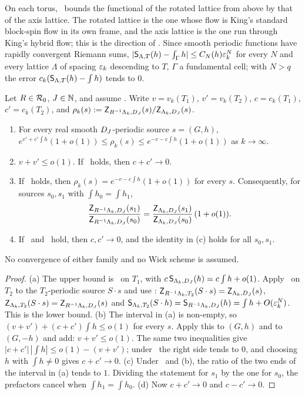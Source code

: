 On each torus, \hypF\ bounds the functional of the rotated lattice from above by that of the axis lattice. The rotated lattice is the one whose flow is King's standard block-spin flow in its own frame, and the axis lattice is the one run through King's hybrid flow; this is the direction of \cite[(4.7)--(4.9)]{K2}. Since smooth periodic functions have rapidly convergent Riemann sums, $|\mathsf S_{\Lambda,T}(h)-\int_\Gamma h|\le C_N(h)\varepsilon_k^N$ for every $N$ and every lattice $\Lambda$ of spacing $\varepsilon_k$ descending to $T$, $\Gamma$ a fundamental cell; with $N>q$ the error $c_k(\mathsf S_{\Lambda,T}(h)-\int h)$ tends to $0$.

\begin{theorem}\label{rot:thm:sandwich}
Let $R\in\mathcal R_0$, $J\in\mathbb N$, and assume \hypF. Write $v=v_k(T_1)$, $v'=v_k(T_2)$, $c=c_k(T_1)$, $c'=c_k(T_2)$, and $\rho_k(s):=\mathsf Z_{R^{-1}\Lambda_k,D_J}(s)/\mathsf Z_{\Lambda_k,D_J}(s)$.
\begin{enumerate}[label=\textup{(\alph*)},nosep]
\item For every real smooth $D_J$-periodic source $s=(G,h)$,
$e^{v'+c'\int h}(1+o(1))\le\rho_k(s)\le e^{-v-c\int h}(1+o(1))$ as $k\to\infty$.
\item $v+v'\le o(1)$. If \hypV\ holds, then $c+c'\to0$.
\item If \hypV\ holds, then $\rho_k(s)=e^{-v-c\int h}(1+o(1))$ for every $s$. Consequently, for sources $s_0,s_1$ with $\int h_0=\int h_1$,
\[
\frac{\mathsf Z_{R^{-1}\Lambda_k,D_J}(s_1)}{\mathsf Z_{R^{-1}\Lambda_k,D_J}(s_0)}=\frac{\mathsf Z_{\Lambda_k,D_J}(s_1)}{\mathsf Z_{\Lambda_k,D_J}(s_0)}\,(1+o(1)).
\]
\item If \hypV\ and \hypCc\ hold, then $c,c'\to0$, and the identity in (c) holds for all $s_0,s_1$.
\end{enumerate}
No convergence of either family and no Wick scheme is assumed.
\end{theorem}

\begin{proof}
(a) The upper bound is \hypF\ on $T_1$, with $c\,\mathsf S_{\Lambda_k,D_J}(h)=c\int h+o(1)$. Apply \hypF\ on $T_2$ to the $T_2$-periodic source $S\cdot s$ and use : $\mathsf Z_{R^{-1}\Lambda_k,T_2}(S\cdot s)=\mathsf Z_{\Lambda_k,D_J}(s)$, $\mathsf Z_{\Lambda_k,T_2}(S\cdot s)=\mathsf Z_{R^{-1}\Lambda_k,D_J}(s)$ and $\mathsf S_{\Lambda_k,T_2}(S\cdot h)=\mathsf S_{R^{-1}\Lambda_k,D_J}(h)=\int h+O(\varepsilon_k^N)$. This is the lower bound.
(b) The interval in (a) is non-empty, so $(v+v')+(c+c')\int h\le o(1)$ for every $s$. Apply this to $(G,h)$ and to $(G,-h)$ and add: $v+v'\le o(1)$. The same two inequalities give $|c+c'|\,|\int h|\le o(1)-(v+v')$; under \hypV\ the right side tends to $0$, and choosing $h$ with $\int h\ne0$ gives $c+c'\to0$.
(c) Under \hypV\ and (b), the ratio of the two ends of the interval in (a) tends to $1$. Dividing the statement for $s_1$ by the one for $s_0$, the prefactors cancel when $\int h_1=\int h_0$.
(d) Now $c+c'\to0$ and $c-c'\to0$.
\end{proof}


